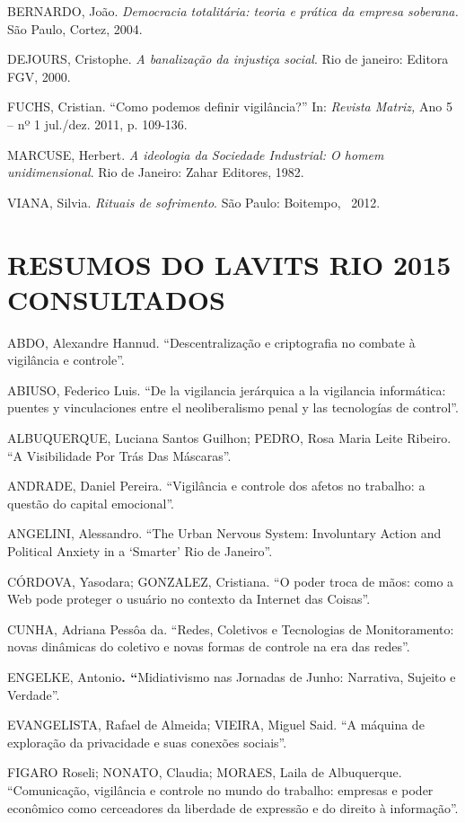 BERNARDO, João. \emph{Democracia totalitária: teoria e prática da
empresa soberana.} São Paulo, Cortez, 2004.

DEJOURS, Cristophe. \emph{A banalização da injustiça social}. Rio de
janeiro: Editora FGV, 2000.

FUCHS, Cristian. ``Como podemos definir vigilância?'' In: \emph{Revista
Matriz,} Ano 5 -- nº 1 jul./dez. 2011, p. 109-136. ~

MARCUSE, Herbert. \emph{A ideologia da Sociedade Industrial: O homem
unidimensional}. Rio de Janeiro: Zahar Editores, 1982.

VIANA, Silvia. \emph{Rituais de sofrimento}. São Paulo: Boitempo, ~2012.

\section{RESUMOS DO LAVITS RIO 2015 CONSULTADOS}

ABDO, Alexandre Hannud. ``Descentralização e criptografia no combate à
vigilância e controle''.

ABIUSO, Federico Luis. ``De la vigilancia jerárquica a la vigilancia
informática: puentes y vinculaciones entre el neoliberalismo penal y las
tecnologías de control''.

ALBUQUERQUE, Luciana Santos Guilhon; PEDRO, Rosa Maria Leite Ribeiro.
``A Visibilidade Por Trás Das Máscaras''.

ANDRADE, Daniel Pereira. ``Vigilância e controle dos afetos no trabalho:
a questão do capital emocional''. ~

ANGELINI, Alessandro. ``The Urban Nervous System: Involuntary Action and
Political Anxiety in a `Smarter' Rio de Janeiro''.

CÓRDOVA, Yasodara; GONZALEZ, Cristiana. ``O poder troca de mãos: como a
Web pode proteger o usuário no contexto da Internet das Coisas''.

CUNHA, Adriana Pessôa da. ``Redes, Coletivos e Tecnologias de
Monitoramento: novas dinâmicas do coletivo e novas formas de controle na
era das redes''.

ENGELKE, Antonio\textbf{. ``}Midiativismo nas Jornadas de Junho:
Narrativa, Sujeito e Verdade''.

EVANGELISTA, Rafael de Almeida; VIEIRA, Miguel Said. ``A máquina de
exploração da privacidade e suas conexões sociais''.

FIGARO Roseli; NONATO, Claudia; MORAES, Laila de Albuquerque.
``Comunicação, vigilância e controle no mundo do trabalho: empresas e
poder econômico como cerceadores da liberdade de expressão e do direito
à informação''.

